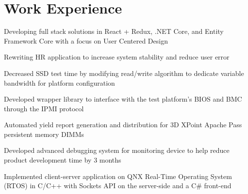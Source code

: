 \documentclass[]{deedy-resume-openfont}
\begin{document}
\begin{minipage}[t]{0.33\textwidth}
\sectionsep

%
%

\end{minipage} 
\hfill
\begin{minipage}[t]{0.66\textwidth} 


\section{Work Experience}

\vspace{\topsep} %
\begin{tightemize}\item Developing full stack solutions in React + Redux, .NET Core, and Entity Framework Core with a focus on User Centered Design \item Rewriting HR application to increase system stability and reduce user error
\end{tightemize}
\sectionsep

\begin{tightemize}
\item Decreased SSD test time by modifying read/write algorithm to dedicate variable bandwidth for platform configuration \item	Developed wrapper library to interface with the test platform’s BIOS and BMC through the IPMI protocol \item Automated yield report generation and distribution for 3D XPoint Apache Pass persistent memory DIMMs\end{tightemize}
\sectionsep

\begin{tightemize}
\item Developed advanced debugging system for monitoring device to help reduce product development time by 3 months\item Implemented client-server application on QNX Real-Time Operating System (RTOS) in C/C++ with Sockets API on the server-side and  a C\# front-end \end{tightemize}
\sectionsep


\end{minipage}
\end{document}
